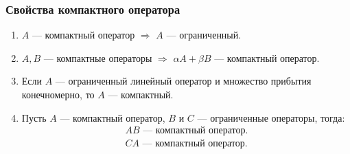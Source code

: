 \documentclass[12pt]{article}
\begin{document}
	\subsubsection{Свойства компактного оператора}
	\begin{enumerate}
		\item $A$ --- компактный оператор $\Rightarrow$ $A$ --- ограниченный.
		\item $A, B$ --- компактные операторы $\Rightarrow$ $\alpha A + \beta B$ --- компактный оператор.
		\item Если $A$ --- ограниченный линейный оператор и множество прибытия конечномерно, то $A$ --- компактный.
		\item Пусть $A$ --- компактный оператор, $B$ и $C$ --- ограниченные операторы, тогда:
		\begin{align*}
			AB \text{ --- компактный оператор.} \\
			CA \text{ --- компактный оператор.}
		\end{align*}
	\end{enumerate}
\end{document}

